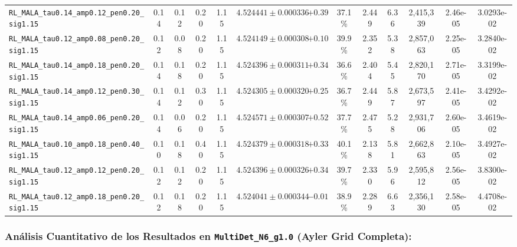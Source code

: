 \documentclass[10pt,a4paper]{article}
\begin{document}
\begin{table}[H]
\begin{adjustbox}{max width=\textwidth}
\begin{tabular}{lcccccccccccc}
\texttt{RL\_MALA\_tau0.14\_amp0.12\_pen0.20\_sig1.15} & 0.14 & 0.12 & 0.20 & 1.15 & $4.524441 \pm 0.000336$ & $+0.39$ & 37.1\% & 2.449 & 6.36 & 2,415,339 & 2.46e-05 & 3.0293e-02 \\
\texttt{RL\_MALA\_tau0.12\_amp0.08\_pen0.20\_sig1.15} & 0.12 & 0.08 & 0.20 & 1.15 & $4.524149 \pm 0.000308$ & $+0.10$ & 39.9\% & 2.352 & 5.38 & 2,857,063 & 2.25e-05 & 3.2840e-02 \\
\texttt{RL\_MALA\_tau0.14\_amp0.18\_pen0.20\_sig1.15} & 0.14 & 0.18 & 0.20 & 1.15 & $4.524396 \pm 0.000311$ & $+0.34$ & 36.6\% & 2.404 & 5.45 & 2,820,170 & 2.71e-05 & 3.3199e-02 \\
\texttt{RL\_MALA\_tau0.14\_amp0.12\_pen0.30\_sig1.15} & 0.14 & 0.12 & 0.30 & 1.15 & $4.524305 \pm 0.000320$ & $+0.25$ & 36.7\% & 2.449 & 5.87 & 2,673,597 & 2.41e-05 & 3.4292e-02 \\
\texttt{RL\_MALA\_tau0.14\_amp0.06\_pen0.20\_sig1.15} & 0.14 & 0.06 & 0.20 & 1.15 & $4.524571 \pm 0.000307$ & $+0.52$ & 37.7\% & 2.475 & 5.28 & 2,931,706 & 2.60e-05 & 3.4619e-02 \\
\texttt{RL\_MALA\_tau0.10\_amp0.18\_pen0.40\_sig1.15} & 0.10 & 0.18 & 0.40 & 1.15 & $4.524379 \pm 0.000318$ & $+0.33$ & 40.1\% & 2.138 & 5.81 & 2,662,863 & 2.10e-05 & 3.4927e-02 \\
\texttt{RL\_MALA\_tau0.12\_amp0.12\_pen0.20\_sig1.15} & 0.12 & 0.12 & 0.20 & 1.15 & $4.524396 \pm 0.000326$ & $+0.34$ & 39.7\% & 2.330 & 5.96 & 2,595,812 & 2.56e-05 & 3.8300e-02 \\
\texttt{RL\_MALA\_tau0.12\_amp0.18\_pen0.20\_sig1.15} & 0.12 & 0.18 & 0.20 & 1.15 & $4.524041 \pm 0.000344$ & $-0.01$ & 38.9\% & 2.289 & 6.63 & 2,356,130 & 2.58e-05 & 4.4708e-02 \\
\bottomrule
\end{tabular}
\end{adjustbox}
\end{table}



\subsubsection{Análisis Cuantitativo de los Resultados en \texttt{MultiDet\_N6\_g1.0} (Ayler Grid Completa):}
\end{document}
